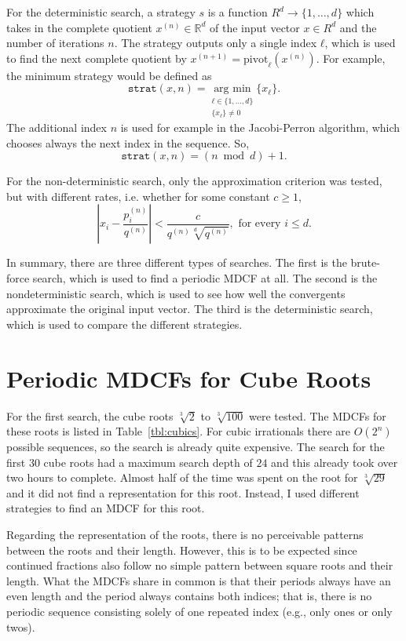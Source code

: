 For the deterministic search, a strategy $s$ is a function $R^d → \{1, …, d\}$
which takes in the complete quotient $x^{(n)} ∈ ℝ^d$ of the input vector $x ∈ R^d$
and the number of iterations $n$.
The strategy outputs only a single index $ℓ$,
which is used to find the next complete quotient by $x^{(n+1)} =
\mathrm{pivot}_ℓ(x^{(n)})$.
For example, the minimum strategy would be defined as
\[
  \texttt{strat}(x, n) = \underset{\substack{ℓ ∈ \{1, …, d\} \\ \{x_ℓ\} ≠ 0}}{\text{arg min}} \{x_ℓ\}.
\]
The additional index $n$ is used for example in the Jacobi-Perron algorithm,
which chooses always the next index in the sequence.
So,
\[
  \texttt{strat}(x, n) = (n \bmod d) + 1.
\]

For the non-deterministic search, only the approximation criterion was tested,
but with different rates, i.e. whether for some constant $c ≥ 1$,
\[
  \left|x_i - \frac{p_i^{(n)}}{q^{(n)}}\right| < \frac{c}{q^{(n)} \sqrt[d]{q^{(n)}}}, \text{ for every } i ≤ d.
\]

In summary,
there are three different types of searches.
The first is the brute-force search, which is used to find a periodic MDCF at all.
The second is the nondeterministic search, which is used to see how well the
convergents approximate the original input vector.
The third is the deterministic search, which is used to compare the different
strategies.
\fi

\iffalse
\section{Periodic MDCFs for Cube Roots}

For the first search, the cube roots $\sqrt[3]{2}$ to $\sqrt[3]{100}$ were tested.
The MDCFs for these roots is listed in Table~\ref{tbl:cubics}.
For cubic irrationals there are $O(2^n)$ possible sequences,
so the search is already quite expensive.
The search for the first 30 cube roots had a maximum search depth of $24$ and
this already took over two hours to complete.
Almost half of the time was spent on the root for $\sqrt[3]{29}$
and it did not find a representation for this root.
Instead, I used different strategies to find an MDCF for this root.

Regarding the representation of the roots,
there is no perceivable patterns between the roots and their length.
However, this is to be expected since continued fractions also follow no simple
pattern between square roots and their length.
What the MDCFs share in common is that their periods always have an even length
and the period always contains both indices;
that is, there is no periodic sequence consisting solely of one repeated index
(e.g., only ones or only twos).

